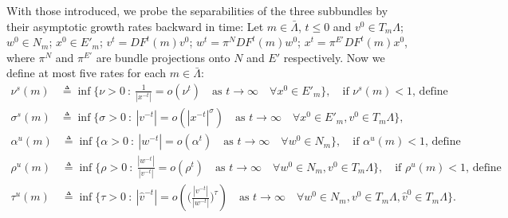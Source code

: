 \documentclass[a4paper,11pt]{article}
\def\blue{\color{blue}}
\theoremstyle{remark}
\begin{document}
With those introduced, we probe the separabilities of the three subbundles by their asymptotic growth rates backward in time: Let $m\in \bar{\Lambda}$, $t\le0$ and $v^0 \in T_m \Lambda$; $w^0\in N_m$; $x^0\in E'_m$; $v^t = DF^t(m)v^0$; $w^t = \pi^N DF^t(m)w^0$; $x^t = \pi^{E'}DF^t(m)x^0$,
where $\pi^N$ and $\pi^{E'}$ are bundle projections onto $N$ and $E'$ respectively.
Now we define {\blue at most five rates} for each $m\in \bar{\Lambda}$:
\begin{align*}
 \nu^s(m) &\triangleq \inf \Big\{\nu>0 \: : \: \frac{1}{|x^{-t}|} = o(\nu^t) \quad \text{as $t \rightarrow \infty$} \quad \forall x^0\in E'_m\Big\}, \quad \text{if $\nu^s(m)<1$, define}\\
 \sigma^s(m) &\triangleq \inf \Big\{\sigma>0 \: : \: |v^{-t}| = o(|x^{-t}|^\sigma) \quad \text{as $t \rightarrow \infty$} \quad \forall x^0\in E'_m, v^0\in T_m\Lambda\Big\},
\end{align*}
\begin{align*}
 \alpha^u(m) &\triangleq \inf \Big\{\alpha>0 \: : \: |w^{-t}| = o(\alpha^t) \quad \text{as $t \rightarrow \infty$}\quad \forall w^0\in N_m\Big\}, \quad \text{if $\alpha^u(m)<1$, define}\\
 \rho^u(m) &\triangleq \inf \Big\{\rho>0 \: : \: \frac{|w^{-t}|}{|v^{-t}|} = o(\rho^t) \quad \text{as $t \rightarrow \infty$} \quad \forall w^0\in N_m, v^0\in T_m\Lambda\Big\},\quad \text{if $\rho^u(m)<1$, define}\\
 \tau^u(m) &\triangleq \inf \Big\{\tau>0 \: : \: |\hat{v}^{-t}| = o\left(\Big(\frac{|v^{-t}|}{|w^{-t}|}\Big)^{\tau}\right) \quad \text{as $t \rightarrow \infty$} \quad \forall w^0\in N_m, v^0\in T_m\Lambda,\hat{v}^0\in T_m\Lambda\Big\}.
\end{align*}
\end{document}
